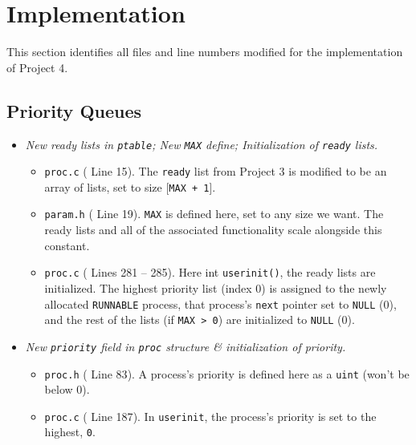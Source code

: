 \documentclass[11pt,letterpaper]{report}
\begin{document}
	\newpage
	\section{Implementation}
	This section identifies all files and line numbers modified for the implementation of Project 4.
	
	\subsection{Priority Queues}
	\begin{itemize}
		\item \emph{New ready lists in {\tt ptable}; New {\tt MAX} define; Initialization of {\tt ready} lists.}
		\begin{itemize}
			\item {\tt proc.c} ({\color{red} Line 15}). The {\tt ready} list from Project 3 is modified to be an array of lists, set to size [{\tt MAX + 1}]. 
			\item {\tt param.h} ({\color{red} Line 19}). {\tt MAX} is defined here, set to any size we want. The ready lists and all of the associated functionality scale alongside this constant.
			\item {\tt proc.c} ({\color{red} Lines 281 -- 285}). Here int {\tt userinit()}, the ready lists are initialized. The highest priority list (index 0) is assigned to the newly allocated {\tt RUNNABLE} process, that process's {\tt next} pointer set to {\tt NULL} (0), and the rest of the lists (if {\tt MAX > 0}) are initialized to {\tt NULL} (0).
		\end{itemize}
		
		\item \emph{New {\tt priority} field in {\tt proc} structure \& initialization of priority.}
		\begin{itemize}
			\item {\tt proc.h} ({\color{red} Line 83}). A process's priority is defined here as a {\tt uint} (won't be below 0).
			\item {\tt proc.c} ({\color{red} Line 187}). In {\tt userinit}, the process's priority is set to the highest, {\tt 0}.
		\end{itemize}
		

\end{itemize}
\end{document}
